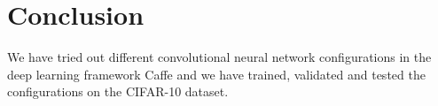 \graphicspath{{Chapters/Project/}}

\section{Conclusion} %
\label{sec:conclusion}

We have tried out different convolutional neural network configurations in the
deep learning framework Caffe and we have trained, validated and tested the
configurations on the CIFAR-10 dataset. 



% 
